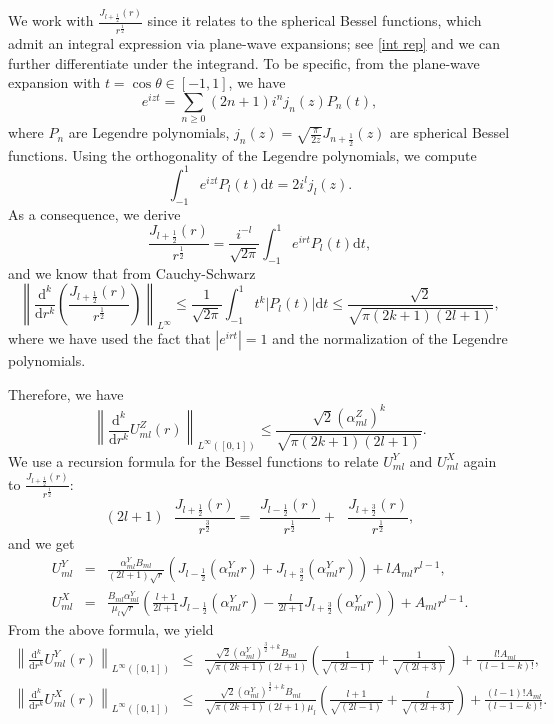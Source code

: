 \documentclass[11pt,a4paper]{article}
\numberwithin{equation}{section}
\newcommand{\mathd}{\mathrm{d}}
\begin{document}
We work with $\frac{J_{l + \frac{1}{2}} (r)}{r^{\frac{1}{2}}}$ since it relates to the spherical Bessel functions, which admit an integral expression via plane-wave expansions; see \eqref{int rep} and we can further differentiate under the integrand. To be specific, from the plane-wave expansion with $t=\cos\theta\in[-1,1]$, we have \[e^{izt}=\sum_{n\geq0}(2n+1)i^nj_n(z)P_n(t),\]
where $P_n$ are Legendre polynomials, $j_n(z)=\sqrt{\frac{\pi}{2z}}J_{n + \frac{1}{2}} (z)$ are spherical Bessel functions. Using the orthogonality of the Legendre polynomials, we compute \[\int_{- 1}^1 e^{i z t} P_l (t) \mathd t=2i^lj_l(z).\]
As a consequence, we derive
\begin{equation}
    \label{int rep}
 \frac{J_{l + \frac{1}{2}} (r)}{r^{\frac{1}{2}}} = \frac{i^{- l}}{\sqrt{2
   \pi}} \int_{- 1}^1 e^{i r t} P_l (t) \mathd t, \end{equation}
and we know that from Cauchy-Schwarz 
\[
  \left\| \frac{\mathd^k}{\mathd r^k} \left( \frac{J_{l + \frac{1}{2}}
  (r)}{r^{\frac{1}{2}}} \right) \right\|_{L^{\infty}}  \leqslant 
  \frac{1}{\sqrt{2 \pi}} \int_{- 1}^1 t^k | P_l (t) | \mathd t \leqslant  \frac{\sqrt{2}}{\sqrt{\pi (2 k + 1) (2 l + 1)}} ,
\]
where we have used the fact that $|e^{i r t}|=1$ and the normalization of the Legendre polynomials.

Therefore, we have
\[ \left\| \frac{\mathd^k}{\mathd r^k} U_{m l}^Z (r) \right\|_{L^{\infty} ([0,
   1])} \leqslant \frac{\sqrt{2} (\alpha^Z_{m l})^k}{\sqrt{\pi (2 k + 1) (2 l
   + 1)}} . \]
We use a recursion formula for the Bessel functions to relate $U_{m l}^Y$ and $U_{m l}^X$ again to $\frac{J_{l + \frac{1}{2}} (r)}{r^{\frac{1}{2}}}$:
\[ (2 l + 1) \text{ } \frac{J_{l + \frac{1}{2}} (r)}{r^{\frac{3}{2}}} = \text{
   } \frac{J_{l - \frac{1}{2}} (r)}{r^{\frac{1}{2}}} + \text{ } \frac{J_{l +
   \frac{3}{2}} (r)}{r^{\frac{1}{2}}}, \]
and we get
\begin{eqnarray*}
  U_{m l}^Y & = & \frac{\alpha^Y_{m l} B_{m l}}{(2 l + 1) \sqrt{r}} \left(
  J_{l - \frac{1}{2}} (\alpha^Y_{m l} r) + J_{l + \frac{3}{2}} (\alpha^Y_{m l}
  r) \right) + l A_{m l} r^{l - 1},\\
  U_{m l}^X & = & \frac{B_{m l} \alpha^Y_{m l}}{\mu_l \sqrt{r}} \left( \frac{l
  + 1}{2 l + 1} J_{l - \frac{1}{2}} (\alpha^Y_{m l} r) - \frac{l}{2 l + 1}
  J_{l + \frac{3}{2}} (\alpha^Y_{m l} r) \right) + A_{m l} r^{l - 1}.
\end{eqnarray*}
From the above formula, we yield
\begin{eqnarray*}
  \left\| \frac{\mathd^k}{\mathd r^k} U_{m l}^Y (r) \right\|_{L^{\infty} ([0,
  1])} & \leqslant & \frac{\sqrt{2} (\alpha^Y_{m l})^{\frac{3}{2} + k} B_{m
  l}}{\sqrt{\pi (2 k + 1)} (2 l + 1)} \left( \frac{1}{\sqrt{(2 l - 1)}} +
  \frac{1}{\sqrt{(2 l + 3)}} \right) + \frac{l!A_{m l}}{(l - 1 - k) !},\\
  \left\| \frac{\mathd^k}{\mathd r^k} U_{m l}^X (r) \right\|_{L^{\infty} ([0,
  1])} & \leqslant & \frac{\sqrt{2} (\alpha^Y_{m l})^{\frac{3}{2} + k} B_{m
  l}}{\sqrt{\pi (2 k + 1)} (2 l + 1) \mu_l} \left( \frac{l + 1}{\sqrt{(2 l -
  1)}} + \frac{l}{\sqrt{(2 l + 3)}} \right) + \frac{(l - 1) !A_{m l}}{(l - 1 -
  k) !} .
\end{eqnarray*}
\end{document}

